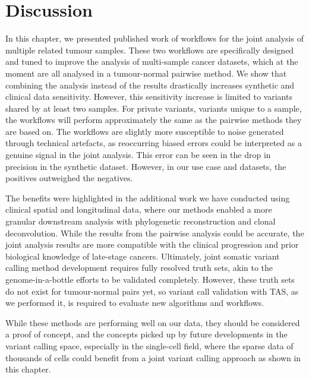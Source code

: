 \section[Discussion]{Discussion}
\label{variantcalling-sec:discussion}

In this chapter, we presented published work of workflows for the joint analysis of multiple related tumour samples. These two workflows are specifically designed and tuned to improve the analysis of multi-sample cancer datasets, which at the moment are all analysed in a tumour-normal pairwise method. We show that combining the analysis instead of the results drastically increases synthetic and clinical data sensitivity. However, this sensitivity increase is limited to variants shared by at least two samples. For private variants, variants unique to a sample, the workflows will perform approximately the same as the pairwise methods they are based on. The workflows are slightly more susceptible to noise generated through technical artefacts, as reoccurring biased errors could be interpreted as a genuine signal in the joint analysis. This error can be seen in the drop in precision in the synthetic dataset. However, in our use case and datasets, the positives outweighed the negatives.

The benefits were highlighted in the additional work we have conducted using clinical spatial and longitudinal data, where our methods enabled a more granular downstream analysis with phylogenetic reconstruction and clonal deconvolution. While the results from the pairwise analysis could be accurate, the joint analysis results are more compatible with the clinical progression and prior biological knowledge of late-stage cancers. Ultimately, joint somatic variant calling method development requires fully resolved truth sets, akin to the genome-in-a-bottle efforts to be validated completely. However, these truth sets do not exist for tumour-normal pairs yet, so variant call validation with TAS, as we performed it, is required to evaluate new algorithms and workflows.

While these methods are performing well on our data, they should be considered a proof of concept, and the concepts picked up by future developments in the variant calling space, especially in the single-cell field, where the sparse data of thousands of cells could benefit from a joint variant calling approach as shown in this chapter.